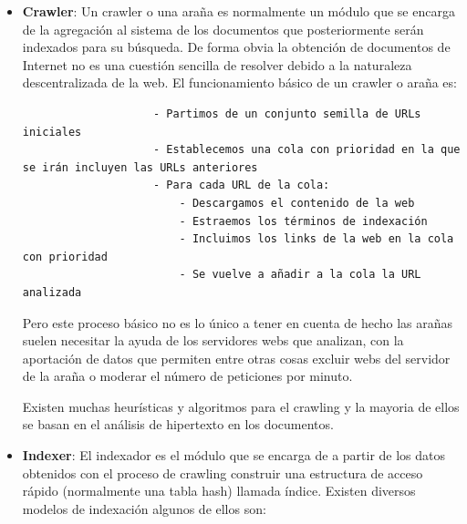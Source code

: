 \documentclass[a4paper, 11pt]{article} %
\begin{document}
		\begin{itemize}
			\item \textbf{Crawler}: Un crawler o una araña es normalmente un módulo que se encarga de la agregación al sistema de los documentos que posteriormente serán indexados para su búsqueda. De forma obvia la obtención de documentos de Internet no es una cuestión sencilla de resolver debido a la naturaleza descentralizada de la web. El funcionamiento básico de un crawler o araña es:
				\begin{verbatim}
					- Partimos de un conjunto semilla de URLs iniciales
					- Establecemos una cola con prioridad en la que se irán incluyen las URLs anteriores
					- Para cada URL de la cola:
					    - Descargamos el contenido de la web
					    - Estraemos los términos de indexación
					    - Incluimos los links de la web en la cola con prioridad
					    - Se vuelve a añadir a la cola la URL analizada
				\end{verbatim}
				Pero este proceso básico no es lo único a tener en cuenta de hecho las arañas suelen necesitar la ayuda de los servidores webs que analizan, con la aportación de datos que permiten entre otras cosas excluir webs del servidor de la araña o moderar el número de peticiones por minuto.

				Existen muchas heurísticas y algoritmos para el crawling y la mayoria de ellos se basan en el análisis de hipertexto en los documentos.
			\item \textbf{Indexer}: El indexador es el módulo que se encarga de a partir de los datos obtenidos con el proceso de crawling construir una estructura de acceso rápido (normalmente una tabla hash) llamada índice. Existen diversos modelos de indexación algunos de ellos son:


\end{itemize}
\end{document}
